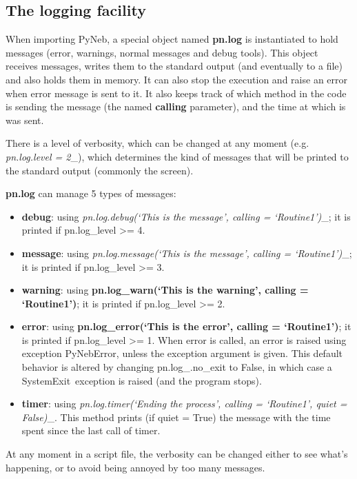 \documentclass[11pt]{article}
\begin{document}
    \subsection{The logging facility}

    When importing PyNeb, a special object named \textbf{pn.log} is
instantiated to hold messages (error, warnings, normal messages and
debug tools). This object receives messages, writes them to the standard
output (and eventually to a file) and also holds them in memory. It can
also stop the execution and raise an error when error message is sent to
it. It also keeps track of which method in the code is sending the
message (the named \textbf{calling} parameter), and the time at which is
was sent.

There is a level of verbosity, which can be changed at any moment (e.g.
\emph{\emph{pn.log}.level = 2}\_), which determines the kind of messages
that will be printed to the standard output (commonly the screen).

\textbf{pn.log} can manage 5 types of messages:

    \begin{itemize}
\item
  \textbf{debug}: using \emph{\emph{pn.log}.debug(`This is the message',
  calling = `Routine1')}\_; it is printed if pn.log\_level
  \textgreater{}= 4.
\item
  \textbf{message}: using \emph{\emph{pn.log}.message(`This is the
  message', calling = `Routine1')}\_; it is printed if pn.log\_level
  \textgreater{}= 3.
\item
  \textbf{warning}: using \textbf{pn.log\_warn(`This is the warning',
  calling = `Routine1')}; it is printed if pn.log\_level \textgreater{}=
  2.
\item
  \textbf{error}: using \textbf{pn.log\_error(`This is the error',
  calling = `Routine1')}; it is printed if pn.log\_level \textgreater{}=
  1. When error is called, an error is raised using exception
  PyNebError, unless the exception argument is given. This default
  behavior is altered by changing pn.log\_.no\_exit to False, in which
  case a SystemExit~exception is raised (and the program stops).
\item
  \textbf{timer}: using \emph{\emph{pn.log}.timer(`Ending the process',
  calling = `Routine1', quiet = False)}\_. This method prints (if quiet
  = True) the message with the time spent since the last call of timer.
\end{itemize}

    At any moment in a script file, the verbosity can be changed either to
see what's happening, or to avoid being annoyed by too many messages.
\end{document}
